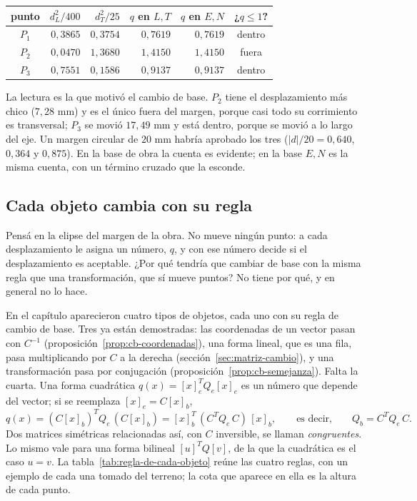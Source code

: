 \begin{center}
\small
\begin{tabular}{crrrrc}
\toprule
punto & \(d_L^2/400\) & \(d_T^2/25\) & \(q\) en \(L,T\) & \(q\) en \(E,N\) & ¿\(q\le1\)?\\
\midrule
\(P_1\) & \(0{,}3865\) & \(0{,}3754\) & \(0{,}7619\) & \(0{,}7619\) & dentro\\
\(P_2\) & \(0{,}0470\) & \(1{,}3680\) & \(1{,}4150\) & \(1{,}4150\) & fuera\\
\(P_3\) & \(0{,}7551\) & \(0{,}1586\) & \(0{,}9137\) & \(0{,}9137\) & dentro\\
\bottomrule
\end{tabular}
\end{center}

La lectura es la que motivó el cambio de base. \(P_2\) tiene el desplazamiento más chico
(\(7{,}28\) mm) y es el único fuera del margen, porque casi todo su corrimiento es
transversal; \(P_3\) se movió \(17{,}49\) mm y está dentro, porque se movió a lo largo del
eje. Un margen circular de \(20\) mm habría aprobado los tres
(\(\lvert d\rvert/20=0{,}640\), \(0{,}364\) y \(0{,}875\)). En la base de obra la cuenta es
evidente; en la base \(E,N\) es la misma cuenta, con un término cruzado que la esconde.

\subsection{Cada objeto cambia con su regla}\label{sec:congruencia}

Pensá en la elipse del margen de la obra. No mueve ningún punto: a cada desplazamiento le asigna
un número, \(q\), y con ese número decide si el desplazamiento es aceptable. ¿Por qué tendría que
cambiar de base con la misma regla que una transformación, que sí mueve puntos? No tiene por
qué, y en general no lo hace.

En el capítulo aparecieron cuatro tipos de objetos, cada uno con su regla de cambio de base.
Tres ya están demostradas: las coordenadas de un vector pasan con
\(C^{-1}\) (proposición~\ref{prop:cb-coordenadas}), una forma lineal, que es una fila, pasa
multiplicando por \(C\) a la derecha (sección~\ref{sec:matriz-cambio}), y una transformación
pasa por conjugación (proposición~\ref{prop:cb-semejanza}). Falta la cuarta. Una forma
cuadrática \(q(x)=[x]_e^TQ_e[x]_e\) es un número que depende del vector; si se reemplaza
\([x]_e=C[x]_b\),
\[
  q(x)=(C[x]_b)^TQ_e\,(C[x]_b)=[x]_b^T\,(C^TQ_e\,C)\,[x]_b ,
  \qquad\text{es decir,}\qquad Q_b=C^TQ_e\,C .
\]
Dos matrices simétricas relacionadas así, con \(C\) inversible, se llaman \emph{congruentes}.
Lo mismo vale para una forma bilineal \([u]^TQ[v]\), de la que la cuadrática es el caso
\(u=v\). La tabla~\ref{tab:regla-de-cada-objeto} reúne las cuatro reglas, con un ejemplo de
cada una tomado del terreno; la cota que aparece en ella es la altura de cada punto.

